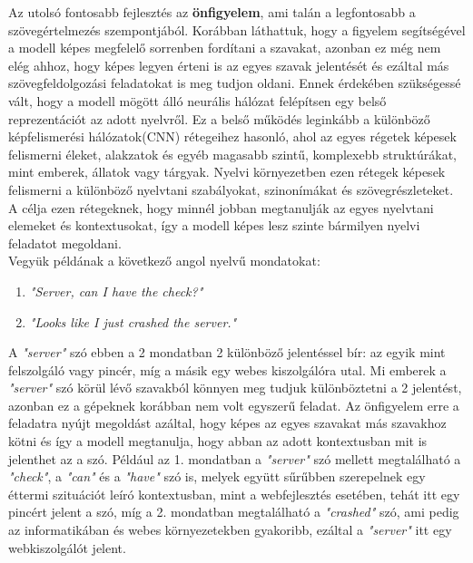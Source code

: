 Az utolsó fontosabb fejlesztés az \textbf{önfigyelem}, ami talán a legfontosabb a szövegértelmezés szempontjából. Korábban láthattuk, hogy a figyelem segítségével a modell képes megfelelő sorrenben fordítani a szavakat, azonban ez még nem elég ahhoz, hogy képes legyen érteni is az egyes szavak jelentését és ezáltal más szövegfeldolgozási feladatokat is meg tudjon oldani. Ennek érdekében szükségessé vált, hogy a modell mögött álló neurális hálózat felépítsen egy belső reprezentációt az adott nyelvről. Ez a belső működés leginkább a különböző képfelismerési hálózatok(CNN) rétegeihez hasonló, ahol az egyes régetek képesek felismerni éleket, alakzatok és egyéb magasabb szintű, komplexebb struktúrákat, mint emberek, állatok vagy tárgyak. Nyelvi környezetben ezen rétegek képesek felismerni a különböző nyelvtani szabályokat, szinonímákat és szövegrészleteket. A célja ezen rétegeknek, hogy minnél jobban megtanulják az egyes nyelvtani elemeket és kontextusokat, így a modell képes lesz szinte bármilyen nyelvi feladatot megoldani.\\
Vegyük példának a következő angol nyelvű mondatokat:

\begin{enumerate}
\item \textit{"Server, can I have the check?"}
\item \textit{"Looks like I just crashed the server."}
\end{enumerate}

A \textit{"server"} szó ebben a 2 mondatban 2 különböző jelentéssel bír: az egyik mint felszolgáló vagy pincér, míg a másik egy webes kiszolgálóra utal. Mi emberek a \textit{"server"} szó körül lévő szavakból könnyen meg tudjuk különböztetni a 2 jelentést, azonban ez a gépeknek korábban nem volt egyszerű feladat. Az önfigyelem erre a feladatra nyújt megoldást azáltal, hogy képes az egyes szavakat más szavakhoz kötni és így a modell megtanulja, hogy abban az adott kontextusban mit is jelenthet az a szó. Például az 1. mondatban a \textit{"server"} szó mellett megtalálható a \textit{"check"}, a \textit{"can"} és a \textit{"have"} szó is, melyek együtt sűrűbben szerepelnek egy éttermi szituációt leíró kontextusban, mint a webfejlesztés esetében, tehát itt egy pincért jelent a szó, míg a 2. mondatban megtalálható a \textit{"crashed"} szó, ami pedig az informatikában és webes környezetekben gyakoribb, ezáltal a \textit{"server"} itt egy webkiszolgálót jelent.

